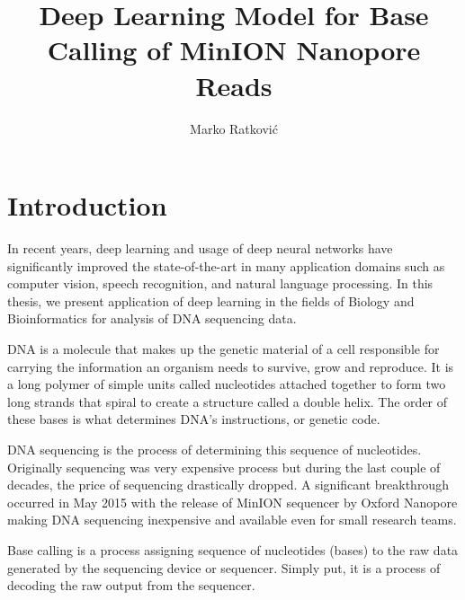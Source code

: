\documentclass[times, utf8, diplomski, english]{fer}
\begin{document}
\title{Deep Learning Model for Base Calling of MinION Nanopore Reads}
\author{Marko Ratković}

\maketitle

\izvornik


\tableofcontents
\listoffigures
\listoftables

\chapter{Introduction}

In recent years,  deep learning and usage of deep neural networks have significantly improved the state-of-the-art in many application domains such as computer vision, speech recognition, and natural language processing. 
In this thesis, we present application of deep learning in the fields of Biology and Bioinformatics for analysis of DNA sequencing data. 

DNA is a molecule that makes up the genetic material of a cell responsible for carrying the information an organism needs to survive, grow and reproduce. 
It is a long polymer of simple units called nucleotides attached together to form two long strands that spiral to create a structure called a double helix. The order of these bases is what determines DNA's instructions, or genetic code.

DNA sequencing is the process of determining this sequence of nucleotides. Originally sequencing was very expensive process but 
during the last couple of decades, the price of sequencing drastically dropped. A significant breakthrough occurred in May 2015 with the release of MinION sequencer by Oxford Nanopore making DNA sequencing inexpensive and available even for small research teams. 

Base calling is a process assigning sequence of nucleotides (bases) to the raw data generated by the sequencing device or sequencer. Simply put, it is a process of decoding the raw output from the sequencer.
\end{document}
